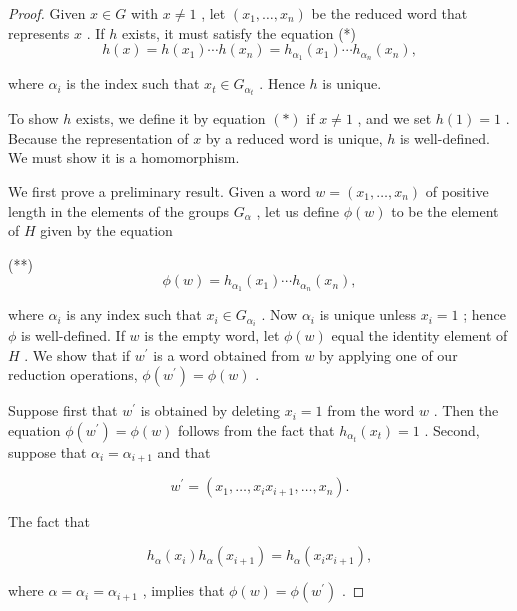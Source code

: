 \begin{proof}Given \(x \in  G\) with \(x \neq  1\) , let \(\left( {{x}_{1},\ldots ,{x}_{n}}\right)\) be the reduced word that represents \(x\) . If \(h\) exists, it must satisfy the equation
(*)
\[
h\left( x\right)  = h\left( {x}_{1}\right) \cdots h\left( {x}_{n}\right)  = {h}_{{\alpha }_{1}}\left( {x}_{1}\right) \cdots {h}_{{\alpha }_{n}}\left( {x}_{n}\right) ,
\]

where \({\alpha }_{i}\) is the index such that \({x}_{t} \in  {G}_{{\alpha }_{t}}\) . Hence \(h\) is unique.

To show \(h\) exists, we define it by equation \(\left( *\right)\) if \(x \neq  1\) , and we set \(h\left( 1\right)  = 1\) . Because the representation of \(x\) by a reduced word is unique, \(h\) is well-defined. We must show it is a homomorphism.

We first prove a preliminary result. Given a word \(w = \left( {{x}_{1},\ldots ,{x}_{n}}\right)\) of positive length in the elements of the groups \({G}_{\alpha }\) , let us define \(\phi \left( w\right)\) to be the element of \(H\) given by the equation

(**)
\[
\phi \left( w\right)  = {h}_{{\alpha }_{1}}\left( {x}_{1}\right) \cdots {h}_{{\alpha }_{n}}\left( {x}_{n}\right) ,
\]

where \({\alpha }_{i}\) is any index such that \({x}_{i} \in  {G}_{{\alpha }_{i}}\) . Now \({\alpha }_{i}\) is unique unless \({x}_{i} = 1\) ; hence \(\phi\) is well-defined. If \(w\) is the empty word, let \(\phi \left( w\right)\) equal the identity element of \(H\) . We show that if \({w}^{\prime }\) is a word obtained from \(w\) by applying one of our reduction operations, \(\phi \left( {w}^{\prime }\right)  = \phi \left( w\right)\) .

Suppose first that \({w}^{\prime }\) is obtained by deleting \({x}_{i} = 1\) from the word \(w\) . Then the equation \(\phi \left( {w}^{\prime }\right)  = \phi \left( w\right)\) follows from the fact that \({h}_{{\alpha }_{t}}\left( {x}_{t}\right)  = 1\) . Second, suppose that \({\alpha }_{i} = {\alpha }_{i + 1}\) and that

\[
{w}^{\prime } = \left( {{x}_{1},\ldots ,{x}_{i}{x}_{i + 1},\ldots ,{x}_{n}}\right) .
\]

The fact that

\[
{h}_{\alpha }\left( {x}_{i}\right) {h}_{\alpha }\left( {x}_{i + 1}\right)  = {h}_{\alpha }\left( {{x}_{i}{x}_{i + 1}}\right) ,
\]

where \(\alpha  = {\alpha }_{i} = {\alpha }_{i + 1}\) , implies that \(\phi \left( w\right)  = \phi \left( {w}^{\prime }\right)\) .


\end{proof}
